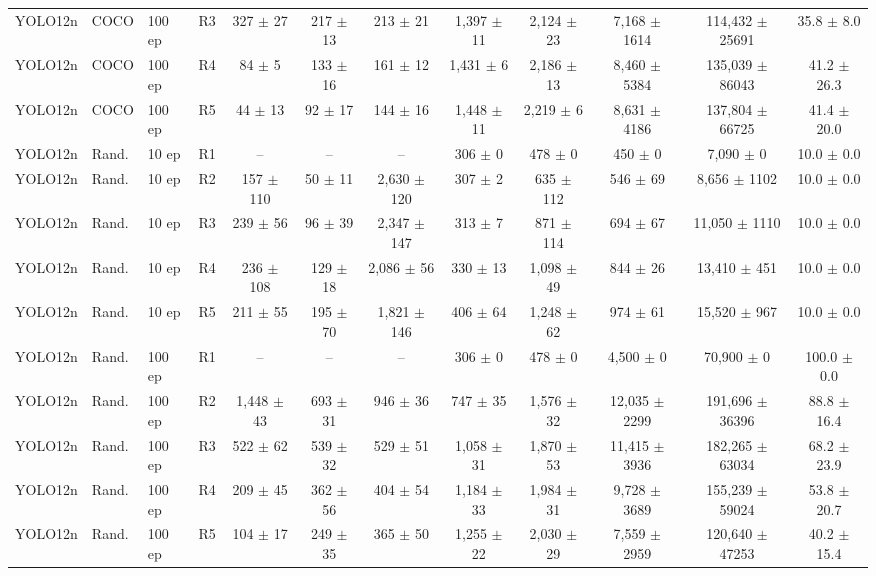 \begin{table}[hbt!]
\begin{tabular}{lllccccccccc}
YOLO12n & COCO & 100 ep & R3 & 327 $\pm$ 27 & 217 $\pm$ 13 & 213 $\pm$ 21 & 1,397 $\pm$ 11 & 2,124 $\pm$ 23 & 7,168 $\pm$ 1614 & 114,432 $\pm$ 25691 & 35.8 $\pm$ 8.0 \\
YOLO12n & COCO & 100 ep & R4 & 84 $\pm$ 5 & 133 $\pm$ 16 & 161 $\pm$ 12 & 1,431 $\pm$ 6 & 2,186 $\pm$ 13 & 8,460 $\pm$ 5384 & 135,039 $\pm$ 86043 & 41.2 $\pm$ 26.3 \\
YOLO12n & COCO & 100 ep & R5 & 44 $\pm$ 13 & 92 $\pm$ 17 & 144 $\pm$ 16 & 1,448 $\pm$ 11 & 2,219 $\pm$ 6 & 8,631 $\pm$ 4186 & 137,804 $\pm$ 66725 & 41.4 $\pm$ 20.0 \\
\midrule
YOLO12n & Rand. & 10 ep & R1 & {--} & {--} & {--} & 306 $\pm$ 0 & 478 $\pm$ 0 & 450 $\pm$ 0 & 7,090 $\pm$ 0 & 10.0 $\pm$ 0.0 \\
YOLO12n & Rand. & 10 ep & R2 & 157 $\pm$ 110 & 50 $\pm$ 11 & 2,630 $\pm$ 120 & 307 $\pm$ 2 & 635 $\pm$ 112 & 546 $\pm$ 69 & 8,656 $\pm$ 1102 & 10.0 $\pm$ 0.0 \\
YOLO12n & Rand. & 10 ep & R3 & 239 $\pm$ 56 & 96 $\pm$ 39 & 2,347 $\pm$ 147 & 313 $\pm$ 7 & 871 $\pm$ 114 & 694 $\pm$ 67 & 11,050 $\pm$ 1110 & 10.0 $\pm$ 0.0 \\
YOLO12n & Rand. & 10 ep & R4 & 236 $\pm$ 108 & 129 $\pm$ 18 & 2,086 $\pm$ 56 & 330 $\pm$ 13 & 1,098 $\pm$ 49 & 844 $\pm$ 26 & 13,410 $\pm$ 451 & 10.0 $\pm$ 0.0 \\
YOLO12n & Rand. & 10 ep & R5 & 211 $\pm$ 55 & 195 $\pm$ 70 & 1,821 $\pm$ 146 & 406 $\pm$ 64 & 1,248 $\pm$ 62 & 974 $\pm$ 61 & 15,520 $\pm$ 967 & 10.0 $\pm$ 0.0 \\
\midrule
YOLO12n & Rand. & 100 ep & R1 & {--} & {--} & {--} & 306 $\pm$ 0 & 478 $\pm$ 0 & 4,500 $\pm$ 0 & 70,900 $\pm$ 0 & 100.0 $\pm$ 0.0 \\
YOLO12n & Rand. & 100 ep & R2 & 1,448 $\pm$ 43 & 693 $\pm$ 31 & 946 $\pm$ 36 & 747 $\pm$ 35 & 1,576 $\pm$ 32 & 12,035 $\pm$ 2299 & 191,696 $\pm$ 36396 & 88.8 $\pm$ 16.4 \\
YOLO12n & Rand. & 100 ep & R3 & 522 $\pm$ 62 & 539 $\pm$ 32 & 529 $\pm$ 51 & 1,058 $\pm$ 31 & 1,870 $\pm$ 53 & 11,415 $\pm$ 3936 & 182,265 $\pm$ 63034 & 68.2 $\pm$ 23.9 \\
YOLO12n & Rand. & 100 ep & R4 & 209 $\pm$ 45 & 362 $\pm$ 56 & 404 $\pm$ 54 & 1,184 $\pm$ 33 & 1,984 $\pm$ 31 & 9,728 $\pm$ 3689 & 155,239 $\pm$ 59024 & 53.8 $\pm$ 20.7 \\
YOLO12n & Rand. & 100 ep & R5 & 104 $\pm$ 17 & 249 $\pm$ 35 & 365 $\pm$ 50 & 1,255 $\pm$ 22 & 2,030 $\pm$ 29 & 7,559 $\pm$ 2959 & 120,640 $\pm$ 47253 & 40.2 $\pm$ 15.4 \\
\bottomrule
\end{tabular}
\end{table}
